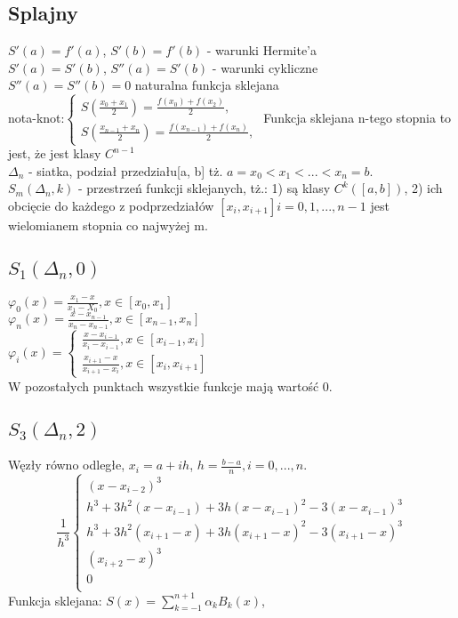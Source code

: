 \documentclass[twocolumn]{article}
\begin{document}
\begin{flushleft}
\section{Splajny}
$S'(a)=f'(a)$, $S'(b)=f'(b)$ - warunki Hermite'a\\
$S'(a)=S'(b)$, $S''(a)=S'(b)$ - warunki cykliczne\\
$S''(a)=S''(b)=0$ naturalna funkcja sklejana\\
nota-knot:$
\begin{cases}
    S(\frac{x_0+x_1}{2})=\frac{f(x_0)+f(x_2)}{2}, \\
    S(\frac{x_{n-1}+x_n}{2})=\frac{f(x_{n-1})+f(x_n)}{2},
\end{cases}$
Funkcja sklejana n-tego stopnia to jest, że jest klasy $C^{n-1}$\\
$\Delta_n $ - siatka, podział przedziału[a, b] tż. $a = x_0 < x_1 < ... < x_n = b$.\\
$S_m(\Delta_n, k)$ - przestrzeń funkcji sklejanych, tż.: 1) są klasy $C^k([a, b])$, 2) ich obcięcie do każdego z podprzedziałów $[x_i, x_{i+1}] i = 0, 1, ..., n-1$ jest wielomianem stopnia co najwyżej m.\\
\subsection{$S_1(\Delta_n, 0)$}
$\varphi_0(x) = \frac{x_1-x}{x_1-X_0}, x \in [x_0, x_1]$\\
$\varphi_n(x) = \frac{x-x_{n-1}}{x_n - x_{n-1}}, x \in [x_{n-1}, x_n]$\\
$\varphi_i(x) =\begin{cases} \frac{x-x_{i-1}}{x_i - x_{i-1}}, x \in [x_{i-1}, x_i]\\ \frac{x_{i+1}-x}{x_{i+1} - x_i}, x \in [x_i, x_{i+1}]\end{cases}$ \\
W pozostałych punktach wszystkie funkcje mają wartość 0.\\
\subsection{$S_3(\Delta_n, 2)$}
Węzły równo odległe, $x_i = a+ih$, $h=\frac{b-a}{n}, i =0,...,n$.\\
$$
\frac{1}{h^3}\begin{cases}
(x - x_{i-2})^3 \\%
h^3 + 3h^2(x - x_{i-1}) + 3h(x - x_{i-1})^2 - 3(x - x_{i-1})^3 \\%
h^3 + 3h^2(x_{i+1} - x) + 3h(x_{i+1} - x)^2 - 3(x_{i+1} - x)^3\\%
(x_{i+2} - x)^3 \\%
0 \\%
\end{cases}
$$
Funkcja sklejana: $S(x) = \sum_{k=-1}^{n+1} \alpha_k B_k(x)$,

\end{flushleft}
\end{document}
